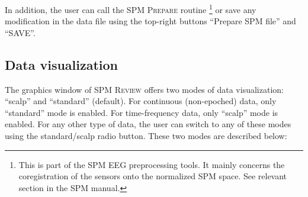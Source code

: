 In addition, the user can call the SPM \textsc{Prepare} routine \footnote{This is part of the SPM EEG preprocessing tools. It mainly concerns the coregistration of the sensors onto the normalized SPM space. See relevant section in the SPM manual.} or save any modification in the data file using the top-right buttons ``Prepare SPM file'' and ``SAVE''.

\subsection{Data visualization}
The graphics window of SPM \textsc{Review} offers two modes of data visualization: ``scalp'' and ``standard'' (default). For continuous (non-epoched) data, only ``standard'' mode is enabled. For time-frequency data, only ``scalp'' mode is enabled. For any other type of data, the user can switch to any of these modes using the standard/scalp radio button.
These two modes are described below:

